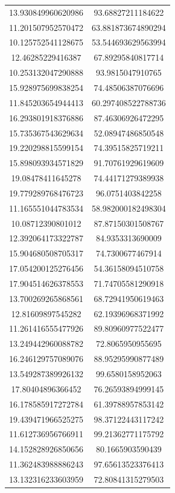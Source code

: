 \begin{table}
\begin{tabular}{cc}
13.930849960620986 & 93.68827211184622 \\
11.201507952570472 & 63.881873674890294 \\
10.125752541128675 & 53.544693629563994 \\
12.46285229416387 & 67.89295840817714 \\
10.253132047290888 & 93.9815047910765 \\
15.928975699838254 & 74.48506387076696 \\
11.845203654944413 & 60.297408522788736 \\
16.293801918376886 & 87.46306926472295 \\
15.735367543629634 & 52.08947486850548 \\
19.220298815599154 & 74.39515825719211 \\
15.898093934571829 & 91.70761929619609 \\
19.08478411645278 & 74.44171279389938 \\
19.779289768476723 & 96.0751403842258 \\
11.165551044783534 & 58.982000182498304 \\
10.08712390801012 & 87.87150301508767 \\
12.392064173322787 & 84.9353313690009 \\
15.904680508705317 & 74.7300677467914 \\
17.054200125276456 & 54.36158094510758 \\
17.904514626378553 & 71.74705581290918 \\
13.700269265868561 & 68.72941950619463 \\
12.81609897545282 & 62.19396968371992 \\
11.261416555477926 & 89.80960977522477 \\
13.249442960088782 & 72.8065950955695 \\
16.246129757089076 & 88.95295990877489 \\
13.549287389926132 & 99.6580158952063 \\
17.80404896366452 & 76.26593894999145 \\
16.178585917272784 & 61.39788957853142 \\
19.439471966525275 & 98.37122443117242 \\
11.612736956766911 & 99.21362771175792 \\
14.152828926850656 & 80.1665903590439 \\
11.362483988886243 & 97.65613523376413 \\
13.132316233603959 & 72.80841315279503 \\

\end{tabular}
\end{table}
